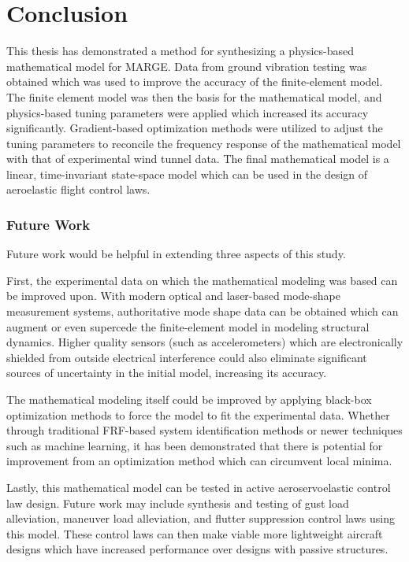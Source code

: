 \chapter{Conclusion}
\label{ch:conclusion}

This thesis has demonstrated a method for synthesizing a physics-based mathematical model for MARGE. Data from ground vibration testing was obtained which was used to improve the accuracy of the finite-element model. The finite element model was then the basis for the mathematical model, and physics-based tuning parameters were applied which increased its accuracy significantly. Gradient-based optimization methods were utilized to adjust the tuning parameters to reconcile the frequency response of the mathematical model with that of experimental wind tunnel data. The final mathematical model is a linear, time-invariant state-space model which can be used in the design of aeroelastic flight control laws.

\subsection{Future Work}

Future work would be helpful in extending three aspects of this study.

First, the experimental data on which the mathematical modeling was based can be improved upon. With modern optical and laser-based mode-shape measurement systems, authoritative mode shape data can be obtained which can augment or even supercede the finite-element model in modeling structural dynamics. Higher quality sensors (such as accelerometers) which are electronically shielded from outside electrical interference could also eliminate significant sources of uncertainty in the initial model, increasing its accuracy.

The mathematical modeling itself could be improved by applying black-box optimization methods to force the model to fit the experimental data. Whether through traditional FRF-based system identification methods or newer techniques such as machine learning, it has been demonstrated that there is potential for improvement from an optimization method which can circumvent local minima.

Lastly, this mathematical model can be tested in active aeroservoelastic control law design. Future work may include synthesis and testing of gust load alleviation, maneuver load alleviation, and flutter suppression control laws using this model. These control laws can then make viable more lightweight aircraft designs which have increased performance over designs with passive structures.